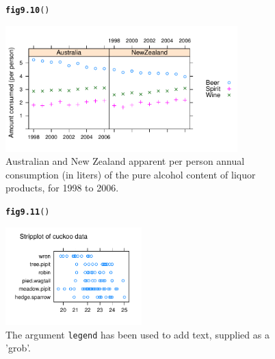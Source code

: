 \documentclass[12pt, a4paper,  BCOR=8.25mm, DIV=15]{scrartcl}\usepackage[]{graphicx}\usepackage[]{color}
\makeatletter
\newcommand{\hlstd}[1]{\textcolor[rgb]{0.345,0.345,0.345}{#1}}%
\newcommand{\hlkwd}[1]{\textcolor[rgb]{0.737,0.353,0.396}{\textbf{#1}}}%
\newenvironment{kframe}{%
 \def\at@end@of@kframe{}%
 \ifinner\ifhmode%
  \def\at@end@of@kframe{\end{minipage}}%
  \begin{minipage}{\columnwidth}%
 \fi\fi%
 \def\FrameCommand##1{\hskip\@totalleftmargin \hskip-\fboxsep
 \colorbox{shadecolor}{##1}\hskip-\fboxsep
     \hskip-\linewidth \hskip-\@totalleftmargin \hskip\columnwidth}%
 \MakeFramed {\advance\hsize-\width
   \@totalleftmargin\z@ \linewidth\hsize
   \@setminipage}}%
 {\par\unskip\endMakeFramed%
 \at@end@of@kframe}
\newenvironment{knitrout}{}{} %
\newcommand{\txtt}[1]{{\texttt{#1}}}
\makeatother
\begin{document}
\begin{figure}[ht]
\begin{knitrout}
\color{fgcolor}\begin{kframe}
\begin{alltt}
\hlkwd{fig9.10}\hlstd{()}
\end{alltt}
\end{kframe}

{\centering \includegraphics[width=0.8\textwidth]{figs/gph-fig9_10e-1} 

}



\end{knitrout}
\caption{Australian and New Zealand apparent per person annual
  consumption (in liters) of the pure alcohol content of liquor products, for
  1998 to 2006.\label{fig:allgrog}}
\end{figure}

\begin{figure}[ht]
\begin{knitrout}
\color{fgcolor}\begin{kframe}
\begin{alltt}
\hlkwd{fig9.11}\hlstd{()}
\end{alltt}
\end{kframe}

{\centering \includegraphics[width=0.47\textwidth]{figs/gph-fig9_11e-1} 

}



\end{knitrout}
\caption{The argument \txtt{legend} has been used to add text,
  supplied as a 'grob'.\label{fig:textGrob}}
\end{figure}
\end{document}
